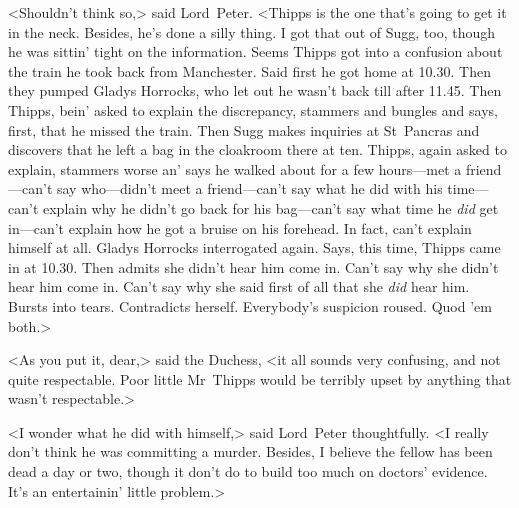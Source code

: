<Shouldn't think so,> said Lord~Peter. <Thipps is the one that's going to get it in the neck. Besides, he's done a silly thing. I got that out of Sugg, too, though he was sittin' tight on the information. Seems Thipps got into a confusion about the train he took back from Manchester. Said first he got home at 10.30. Then they pumped Gladys Horrocks, who let out he wasn't back till after 11.45. Then Thipps, bein' asked to explain the discrepancy, stammers and bungles and says, first, that he missed the train. Then Sugg makes inquiries at St~Pancras and discovers that he left a bag in the cloakroom there at ten. Thipps, again asked to explain, stammers worse an' says he walked about for a few hours—met a friend—can't say who—didn't meet a friend—can't say what he did with his time—can't explain why he didn't go back for his bag—can't say what time he \emph{did} get in—can't explain how he got a bruise on his forehead. In fact, can't explain himself at all. Gladys Horrocks interrogated again. Says, this time, Thipps came in at 10.30. Then admits she didn't hear him come in. Can't say why she didn't hear him come in. Can't say why she said first of all that she \emph{did} hear him. Bursts into tears. Contradicts herself. Everybody's suspicion roused. Quod 'em both.>

<As you put it, dear,> said the Duchess, <it all sounds very confusing, and not quite respectable. Poor little Mr~Thipps would be terribly upset by anything that wasn't respectable.>

<I wonder what he did with himself,> said Lord~Peter thoughtfully. <I really don't think he was committing a murder. Besides, I believe the fellow has been dead a day or two, though it don't do to build too much on doctors' evidence. It's an entertainin' little problem.>

